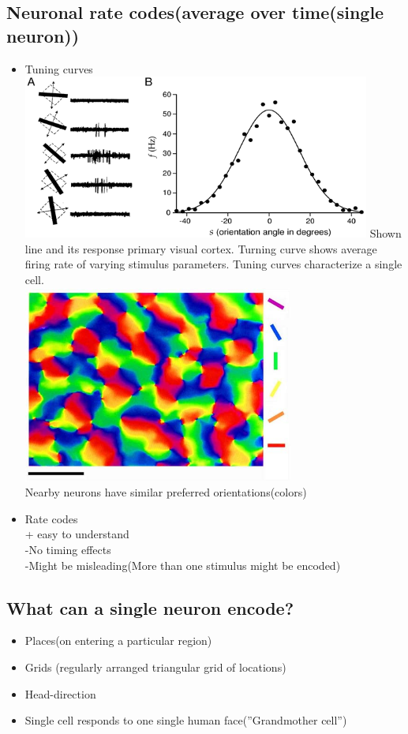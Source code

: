\documentclass[english,11pt]{article}
\begin{document}
\subsection{Neuronal rate codes(average over time(single neuron))}
\begin{itemize}
\item Tuning curves
\subitem \includegraphics[width=0.9\textwidth]{tuning-curve.png}
\subitem Shown line and its response primary visual cortex. Turning curve shows average firing rate of varying stimulus parameters. Tuning curves characterize a single cell.\\
\subitem \includegraphics[width=0.7\textwidth]{orientation-map.png}\\
Nearby neurons have similar preferred orientations(colors)
\item Rate codes\\ + easy to understand\\ -No timing effects\\ -Might be misleading(More than one stimulus might be encoded)
\end{itemize}

\subsection{What can a single neuron encode?}
\begin{itemize}
\item Places(on entering a particular region)
\item Grids (regularly arranged triangular grid of locations)
\item Head-direction
\item Single cell responds to one single human face(''Grandmother cell'')
\end{itemize}
\end{document}
